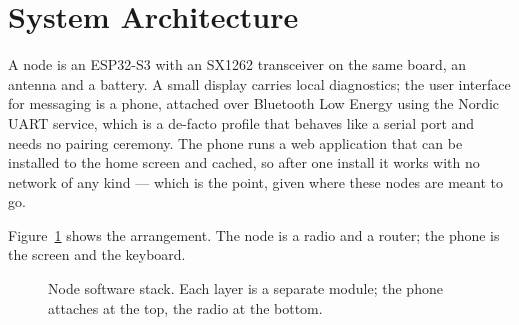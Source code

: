 \documentclass[conference]{IEEEtran}
\begin{document}
\section{System Architecture}\label{sec:arch}

A node is an ESP32-S3 with an SX1262 transceiver on the same board, an antenna
and a battery. A small display carries local diagnostics; the user interface
for messaging is a phone, attached over
Bluetooth Low Energy using the Nordic UART service, which is a de-facto profile
that behaves like a serial port and needs no pairing ceremony. The phone runs a
web application that can be installed to the home screen and cached, so after one
install it works with no network of any kind — which is the point, given where
these nodes are meant to go.

Figure~\ref{fig:arch} shows the arrangement. The node is a radio and a router;
the phone is the screen and the keyboard.

\begin{figure}[!t]
\centering
{}
\caption{Node software stack. Each layer is a separate module; the phone attaches
at the top, the radio at the bottom.}
\label{fig:arch}
\end{figure}
\end{document}
